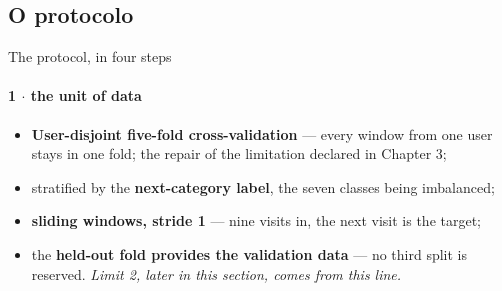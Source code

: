 \documentclass{beamer}
\begin{document}
\subsection{O protocolo}

\begin{frame}{The protocol, in four steps}
    \framesubtitle{1 $\cdot$ the unit of data}

    \begin{itemize}\setlength{\itemsep}{2ex}
        \item \textbf{User-disjoint five-fold cross-validation} --- every window from one user
              stays in one fold; \alert{the repair of the limitation declared in Chapter 3};
        \item stratified by the \textbf{next-category label}, the seven classes being imbalanced;
        \item \textbf{sliding windows, stride 1} --- nine visits in, the next visit is the target;
        \item the \textbf{held-out fold provides the validation data} --- no third split is
              reserved. \emph{Limit 2, later in this section, comes from this line.}
    \end{itemize}
\end{frame}
\end{document}
